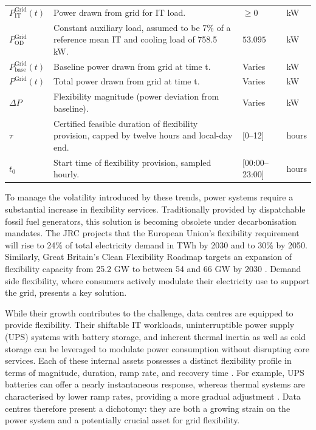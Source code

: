 \documentclass[lettersize,journal]{IEEEtran}
\begin{document}
{{\begin{longtable}{p{} p{} p{} p{}}
$P^{\mathrm{Grid}}_{\mathrm{IT}}(t)$ & Power drawn from grid for IT load. & $\geq 0$ &kW \\
$P^{\mathrm{Grid}}_{\mathrm{OD}}$ & Constant auxiliary load, assumed to be 7\% of a reference mean IT and cooling load of 758.5 kW. & $53.095$ &kW \\
$P^{\mathrm{Grid}}_{\mathrm{base}}(t)$ & Baseline power drawn from grid at time t. & Varies &kW \\
$P^{\mathrm{Grid}}(t)$ & Total power drawn from grid at time t. & Varies &kW \\
$\Delta P$ & Flexibility magnitude (power deviation from baseline). & Varies &kW \\
$\tau$ & Certified feasible duration of flexibility provision, capped by twelve hours and local-day end. & [0--12] & hours \\
$t_0$ & Start time of flexibility provision, sampled hourly. & [00:00--23:00] & hours \\
\end{longtable}
\twocolumn
}
} %
To manage the volatility introduced by these trends, power systems require a substantial increase in flexibility services. Traditionally provided by dispatchable fossil fuel generators, this solution is becoming obsolete under decarbonisation mandates. The JRC \cite{koolen2023flexibility} projects that the European Union’s flexibility requirement will rise to 24\% of total electricity demand in TWh by 2030 and to 30\% by 2050. Similarly, Great Britain’s Clean Flexibility Roadmap targets an expansion of flexibility capacity from 25.2 GW to between 54 and 66 GW by 2030 \cite{clean_flexibility_roadmap}. Demand side flexibility, where consumers actively modulate their electricity use to support the grid, presents a key solution.

While their growth contributes to the challenge, data centres are equipped to provide flexibility. Their shiftable IT workloads, uninterruptible power supply (UPS) systems with battery storage, and inherent thermal inertia as well as cold storage can be leveraged to modulate power consumption without disrupting core services. Each of these internal assets possesses a distinct flexibility profile in terms of magnitude, duration, ramp rate, and recovery time \cite{zhang2025unlocking}. For example, UPS batteries can offer a nearly instantaneous response, whereas thermal systems are characterised by lower ramp rates, providing a more gradual adjustment \cite{zhang2025unlocking, alapera2018data}. Data centres therefore present a dichotomy: they are both a growing strain on the power system and a potentially crucial asset for grid flexibility.
\end{document}
